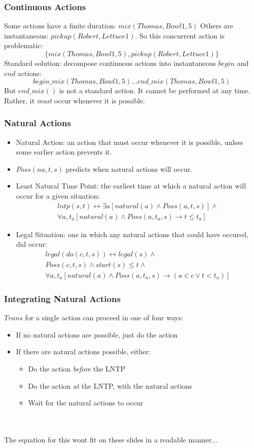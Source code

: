 \documentclass[compress]{beamer}
\begin{document}
\begin{frame}
\frametitle{Continuous Actions}
Some actions have a finite duration: $mix(Thomas,Bowl1,5)$
Others are instantaneous: $pickup(Robert,Lettuce1)$.
So this concurrent action is problematic:\[
\{mix(Thomas,Bowl1,5),pickup(Robert,Lettuce1)\}\]
Standard solution: decompose continuous actions into instantaneous $begin$
and $end$ actions:\[
begin\_mix(Thomas,Bowl1,5) \dots end\_mix(Thomas,Bowl1,5)\]
But $end\_mix()$ is not a standard action.  It cannot be performed at
any time.  Rather, it \emph{must} occur whenever it is possible.
\end{frame}

\begin{frame}
\frametitle{Natural Actions}
\begin{itemize}
  \item Natural Action:  an action that must occur whenever it is possible,
        unless some earlier action prevents it.
  \item $Poss(na,t,s)$ predicts when natural actions will occur.
  \item Least Natural Time Point: the earliest time at which a natural
        action will occur for a given situation:\[
\begin{array}{c}
lntp(s,t) \leftrightarrow \exists a [natural(a) \wedge Poss(a,t,s)] \wedge\\
\forall a,t_a [natural(a) \wedge Poss(a,t_a,s) \rightarrow t \leq t_a]
\end{array}\]
  \item Legal Situation: one in which any natural actions that could have occured, did occur:\[
\begin{array}{c}
legal(do(c,t,s)) \leftrightarrow legal(s) \wedge\\
Poss(c,t,s) \wedge start(s) \leq t \wedge\\
\forall a,t_a [natural(a) \wedge Poss(a,t_a,s) \rightarrow (a \in c \vee t < t_a)]
\end{array}\]
\end{itemize}
\end{frame}

\begin{frame}
\frametitle{Integrating Natural Actions}
$Trans$ for a single action can proceed in one of four ways:
\begin{itemize}
\item If no natural actions are possible, just do the action
\item If there are natural actions possible, either:
\begin{itemize}
\item Do the action \emph{before} the LNTP
\item Do the action \emph{at} the LNTP, with the natural actions
\item Wait for the natural actions to occur
\end{itemize}
\end{itemize}
\ \\
\ \\
The equation for this wont fit on these slides in a readable manner...
\end{frame}
\end{document}
